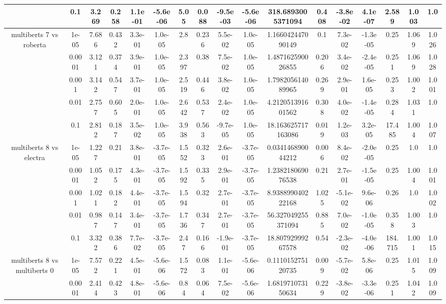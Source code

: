 \begin{tabular}{|c|c|c|c|c|c|c|c|c|c|c|c|c|c|c|c|c|}
 & 0.1 & 3.269 & 0.258 & 1.1e-01 & -5.6e-06 & 5.05 & 0.088 & -9.5e-03 & -5.6e-06 & 318.6893005371094 & 0.408 & -3.8e-02 & 4.1e-07 & 2.589 & 1.003 & 1.0 \\
\hline
\multirow{5}{*}{multiberts 7 vs roberta } & 1e-05 & 7.686 & 0.432 & 3.3e-01 & 1.0e-05 & 2.8 & 0.236 & 5.5e-02 & 1.0e-05 & 1.166042447090149 & 0.1 & 7.3e-02 & -1.3e-05 & 0.25 & 1.069 & 1.026 \\
 & 0.0001 & 3.121 & 0.374 & 3.9e-01 & 1.0e-05 & 2.397 & 0.38 & 7.5e-02 & 1.0e-05 & 1.487162590026855 & 0.206 & 3.4e-02 & -2.4e-05 & 0.251 & 1.069 & 1.028 \\
 & 0.001 & 3.142 & 0.547 & 3.7e-01 & 1.0e-05 & 2.519 & 0.446 & 3.8e-02 & 1.0e-05 & 1.798205614089965 & 0.269 & 2.9e-01 & 1.6e-05 & 0.253 & 1.002 & 1.001 \\
 & 0.01 & 2.757 & 0.605 & 2.0e-01 & 1.0e-05 & 2.642 & 0.537 & 2.4e-02 & 1.0e-05 & 4.212051391601562 & 0.308 & 4.0e-02 & -1.4e-05 & 0.284 & 1.031 & 1.0 \\
 & 0.1 & 2.812 & 0.187 & 3.5e-02 & 1.0e-05 & 3.938 & 0.563 & -9.7e-05 & 1.0e-05 & 18.163625717163086 & 0.019 & 1.2e-03 & 3.2e-05 & 17.485 & 1.004 & 1.007 \\
\hline
\multirow{5}{*}{multiberts 8 vs electra } & 1e-05 & 1.227 & 0.21 & 3.8e-01 & -3.7e-05 & 1.552 & 0.323 & 2.6e-01 & -3.7e-05 & 0.034146890044212 & 0.006 & 8.4e-02 & -2.0e-05 & 0.25 & 1.0 & 1.0 \\
 & 0.0001 & 1.052 & 0.175 & 4.3e-01 & -3.7e-05 & 1.592 & 0.335 & 2.9e-01 & -3.7e-05 & 1.238218069076538 & 0.21 & 2.7e-01 & -1.5e-05 & 0.25 & 1.004 & 1.001 \\
 & 0.001 & 1.021 & 0.182 & 4.4e-01 & -3.7e-05 & 1.594 & 0.32 & 2.7e-01 & -3.7e-05 & 8.938899040222168 & 1.025 & -5.1e-02 & 9.6e-06 & 0.26 & 1.0 & 1.002 \\
 & 0.01 & 0.987 & 0.147 & 3.4e-01 & -3.7e-05 & 1.736 & 0.347 & 2.7e-01 & -3.7e-05 & 56.327049255371094 & 0.885 & 7.0e-02 & -1.0e-05 & 0.358 & 1.003 & 1.0 \\
 & 0.1 & 3.322 & 0.386 & 7.7e-02 & -3.7e-05 & 2.47 & 0.166 & -1.9e-01 & -3.7e-05 & 18.80792999267578 & 0.54 & -2.3e-02 & -4.0e-06 & 184.715 & 1.001 & 1.015 \\
\hline
\multirow{5}{*}{multiberts 8 vs multiberts 0} & 1e-05 & 7.572 & 0.221 & 4.5e-01 & -5.6e-06 & 1.572 & 0.083 & 1.1e-01 & -5.6e-06 & 0.111015275120735 & 0.009 & -5.7e-02 & 5.8e-06 & 0.25 & 1.015 & 1.009 \\
 & 0.0001 & 2.414 & 0.423 & 4.8e-01 & -5.6e-06 & 0.84 & 0.064 & 7.5e-02 & -5.6e-06 & 1.681971073150634 & 0.229 & -3.8e-02 & -3.3e-06 & 0.251 & 1.042 & 1.009 \\

\end{tabular}
